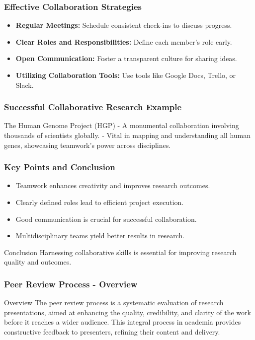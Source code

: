 \documentclass[aspectratio=169]{beamer}
\begin{document}
\begin{frame}[fragile]
    \frametitle{Effective Collaboration Strategies}
    \begin{itemize}
        \item \textbf{Regular Meetings:} Schedule consistent check-ins to discuss progress.
        \item \textbf{Clear Roles and Responsibilities:} Define each member’s role early.
        \item \textbf{Open Communication:} Foster a transparent culture for sharing ideas.
        \item \textbf{Utilizing Collaboration Tools:} Use tools like Google Docs, Trello, or Slack.
    \end{itemize}
\end{frame}

\begin{frame}[fragile]
    \frametitle{Successful Collaborative Research Example}
    \begin{block}{The Human Genome Project (HGP)}
        - A monumental collaboration involving thousands of scientists globally.
        - Vital in mapping and understanding all human genes, showcasing teamwork's power across disciplines.
    \end{block}
\end{frame}

\begin{frame}[fragile]
    \frametitle{Key Points and Conclusion}
    \begin{itemize}
        \item Teamwork enhances creativity and improves research outcomes.
        \item Clearly defined roles lead to efficient project execution.
        \item Good communication is crucial for successful collaboration.
        \item Multidisciplinary teams yield better results in research.
    \end{itemize}
    \begin{block}{Conclusion}
        Harnessing collaborative skills is essential for improving research quality and outcomes.
    \end{block}
\end{frame}

\begin{frame}[fragile]
    \frametitle{Peer Review Process - Overview}
    \begin{block}{Overview}
        The peer review process is a systematic evaluation of research presentations, aimed at enhancing the quality, credibility, and clarity of the work before it reaches a wider audience. This integral process in academia provides constructive feedback to presenters, refining their content and delivery.
    \end{block}
\end{frame}
\end{document}

